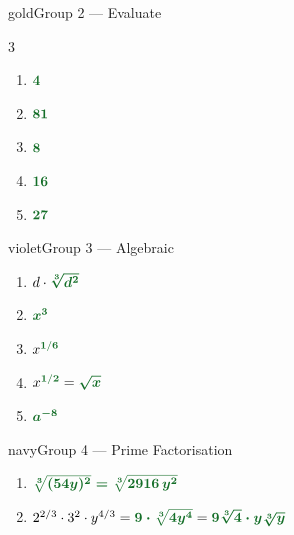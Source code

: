 \documentclass[12pt]{article}
\begin{document}
\vspace{8pt}

\begin{pracbox}{gold}{Group 2 --- Evaluate}
\begin{multicols}{3}
\begin{enumerate}[label=\textbf{\arabic*.}, itemsep=5pt, start=8]
  \item ${\color{ansgreen}\boldsymbol{4}}$
  \item ${\color{ansgreen}\boldsymbol{81}}$
  \item ${\color{ansgreen}\boldsymbol{8}}$
  \item ${\color{ansgreen}\boldsymbol{16}}$
  \item ${\color{ansgreen}\boldsymbol{27}}$
\end{enumerate}
\end{multicols}
\end{pracbox}

\vspace{8pt}

\begin{pracbox}{violet}{Group 3 --- Algebraic}
\begin{enumerate}[label=\textbf{\arabic*.}, itemsep=5pt, start=13]
  \item $d\cdot{\color{ansgreen}\boldsymbol{\sqrt[3]{d^2}}}$
  \item ${\color{ansgreen}\boldsymbol{x^3}}$
  \item $x^{{\color{ansgreen}\mathbf{1/6}}}$
  \item $x^{{\color{ansgreen}\mathbf{1/2}}} = {\color{ansgreen}\boldsymbol{\sqrt{x}}}$
  \item ${\color{ansgreen}\boldsymbol{a^{-8}}}$
\end{enumerate}
\end{pracbox}

\vspace{8pt}

\begin{pracbox}{navy}{Group 4 --- Prime Factorisation}
\begin{enumerate}[label=\textbf{\arabic*.}, itemsep=6pt, start=18]
  \item ${\color{ansgreen}\boldsymbol{\sqrt[3]{(54y)^2}=\sqrt[3]{2916\,y^2}}}$
  \item $2^{2/3}\cdot 3^2\cdot y^{4/3}
        = {\color{ansgreen}\boldsymbol{9\cdot\sqrt[3]{4y^4}}}
        = {\color{ansgreen}\boldsymbol{9\sqrt[3]{4}\cdot y\sqrt[3]{y}}}$
\end{enumerate}
\end{pracbox}
\end{document}
